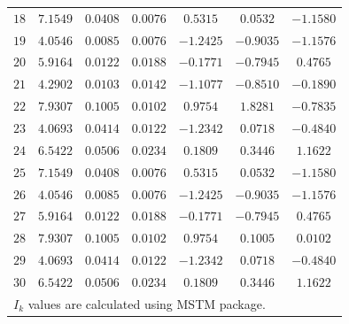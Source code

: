 \documentclass[final,  3p]{elsarticle}
\begin{document}
\begin{table}[h]
\begin{center}
\begin{tabular}{|c|c|c|c|c|c|c|}
$18$ & $7.1549$ & $0.0408$ & $0.0076$ & $ 0.5315$ & $ 0.0532$ & $-1.1580$ \\
$19$ & $4.0546$ & $0.0085$ & $0.0076$ & $-1.2425$ & $-0.9035$ & $-1.1576$ \\
$20$ & $5.9164$ & $0.0122$ & $0.0188$ & $-0.1771$ & $-0.7945$ & $ 0.4765$ \\
$21$ & $4.2902$ & $0.0103$ & $0.0142$ & $-1.1077$ & $-0.8510$ & $-0.1890$ \\
$22$ & $7.9307$ & $0.1005$ & $0.0102$ & $ 0.9754$ & $ 1.8281$ & $-0.7835$ \\
$23$ & $4.0693$ & $0.0414$ & $0.0122$ & $-1.2342$ & $ 0.0718$ & $-0.4840$ \\
$24$ & $6.5422$ & $0.0506$ & $0.0234$ & $ 0.1809$ & $ 0.3446$ & $ 1.1622$ \\
$25$ & $7.1549$ & $0.0408$ & $0.0076$ & $ 0.5315$ & $ 0.0532$ & $-1.1580$ \\
$26$ & $4.0546$ & $0.0085$ & $0.0076$ & $-1.2425$ & $-0.9035$ & $-1.1576$ \\
$27$ & $5.9164$ & $0.0122$ & $0.0188$ & $-0.1771$ & $-0.7945$ & $ 0.4765$ \\
$28$ & $7.9307$ & $0.1005$ & $0.0102$ & $ 0.9754$ & $ 0.1005$ & $ 0.0102$ \\
$29$ & $4.0693$ & $0.0414$ & $0.0122$ & $-1.2342$ & $ 0.0718$ & $-0.4840$ \\
$30$ & $6.5422$ & $0.0506$ & $0.0234$ & $ 0.1809$ & $ 0.3446$ & $ 1.1622$ \\
\hline\hline
\multicolumn{7}{l}{\small *$I_k$ values are calculated using MSTM package.}
\end{tabular}
\end{center}
\label{sec:App2}
\end{table}


\end{document}
